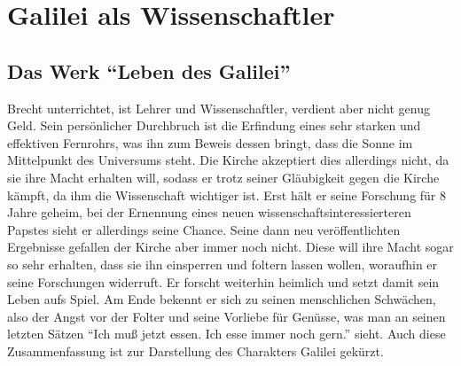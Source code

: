 \documentclass[12pt]{scrreprt}
\begin{document}
\chapter{Galilei als Wissenschaftler}
	\label{chap:galilei als wissenschaftler}
\section{Das Werk \enquote{Leben des Galilei}}
	\label{sec:das werk leben des galilei}
Brecht unterrichtet, ist Lehrer und Wissenschaftler, verdient aber nicht genug Geld.
Sein persönlicher Durchbruch ist die Erfindung eines sehr starken und effektiven Fernrohrs, was ihn zum Beweis dessen bringt, dass die Sonne im Mittelpunkt des Universums steht.
Die Kirche akzeptiert dies allerdings nicht, da sie ihre Macht erhalten will, sodass er trotz seiner Gläubigkeit gegen die Kirche kämpft, da ihm die Wissenschaft wichtiger ist.
Erst hält er seine Forschung für 8 Jahre geheim, bei der Ernennung eines neuen wissenschaftsinteressierteren Papstes sieht er allerdings seine Chance.
Seine dann neu veröffentlichten Ergebnisse gefallen der Kirche aber immer noch nicht.
Diese will ihre Macht sogar so sehr erhalten, dass sie ihn einsperren und foltern lassen wollen, woraufhin er seine Forschungen widerruft.
Er forscht weiterhin heimlich und setzt damit sein Leben aufs Spiel.
Am Ende bekennt er sich zu seinen menschlichen Schwächen, also der Angst vor der Folter und seine Vorliebe für Genüsse, was man an seinen letzten Sätzen \enquote{Ich muß jetzt essen. Ich esse immer noch gern.} sieht.
Auch diese Zusammenfassung ist zur Darstellung des Charakters Galilei gekürzt.
\autocite{wiki:Galilei_Studyflix}
\autocite{wiki:Leben_des_Galilei}
\end{document}

